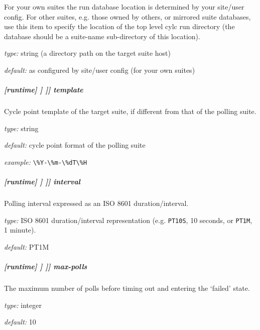 For your own suites the run database location is determined by your
site/user config. For other suites, e.g. those owned by others, or
mirrored suite databases, use this item to specify the location
of the top level cylc run directory (the database should be a
suite-name sub-directory of this location).

\begin{myitemize}
    \item {\em type:} string (a directory path on the target suite host)
    \item {\em default:} as configured by site/user config (for your own suites)
\end{myitemize}

\subparagraph[template]{[runtime] \textrightarrow [[\_\_NAME\_\_]] \textrightarrow [[[suite state polling]]] \textrightarrow template}

Cycle point template of the target suite, if different from that of the polling suite.

\begin{myitemize}
    \item {\em type:} string
    \item {\em default:} cycle point format of the polling suite
    \item {\em example:} \lstinline=\%Y-\%m-\%dT\%H=
\end{myitemize}

\subparagraph[interval]{[runtime] \textrightarrow [[\_\_NAME\_\_]] \textrightarrow [[[suite state polling]]] \textrightarrow interval}

Polling interval expressed as an ISO 8601 duration/interval.
\begin{myitemize}
    \item {\em type:} ISO 8601 duration/interval representation (e.g.
 \lstinline=PT10S=, 10 seconds, or \lstinline=PT1M=, 1 minute).
    \item {\em default:} PT1M
\end{myitemize}

\subparagraph[max-polls]{[runtime] \textrightarrow [[\_\_NAME\_\_]] \textrightarrow [[[suite state polling]]] \textrightarrow max-polls}

The maximum number of polls before timing out and entering the `failed' state.

\begin{myitemize}
    \item {\em type:} integer
    \item {\em default:} 10
\end{myitemize}

